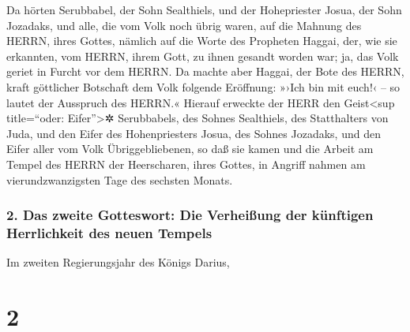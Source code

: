 Da hörten Serubbabel, der Sohn Sealthiels, und der
Hohepriester Josua, der Sohn Jozadaks, und alle, die vom Volk noch übrig
waren, auf die Mahnung des HERRN, ihres Gottes, nämlich auf die Worte
des Propheten Haggai, der, wie sie erkannten, vom HERRN, ihrem Gott, zu
ihnen gesandt worden war; ja, das Volk geriet in Furcht vor dem HERRN.
 Da machte aber Haggai, der Bote des HERRN, kraft
göttlicher Botschaft dem Volk folgende Eröffnung: »›Ich bin mit euch!‹
-- so lautet der Ausspruch des HERRN.«  Hierauf erweckte
der HERR den Geist\textless sup title=``oder: Eifer''\textgreater✲
Serubbabels, des Sohnes Sealthiels, des Statthalters von Juda, und den
Eifer des Hohenpriesters Josua, des Sohnes Jozadaks, und den Eifer aller
vom Volk Übriggebliebenen, so daß sie kamen und die Arbeit am Tempel des
HERRN der Heerscharen, ihres Gottes, in Angriff nahmen 
am vierundzwanzigsten Tage des sechsten Monats.

\hypertarget{das-zweite-gotteswort-die-verheiuxdfung-der-kuxfcnftigen-herrlichkeit-des-neuen-tempels}{%
\subsubsection{2. Das zweite Gotteswort: Die Verheißung der künftigen
Herrlichkeit des neuen
Tempels}\label{das-zweite-gotteswort-die-verheiuxdfung-der-kuxfcnftigen-herrlichkeit-des-neuen-tempels}}

Im zweiten Regierungsjahr des Königs Darius,

\hypertarget{section-1}{%
\section{2}\label{section-1}}

